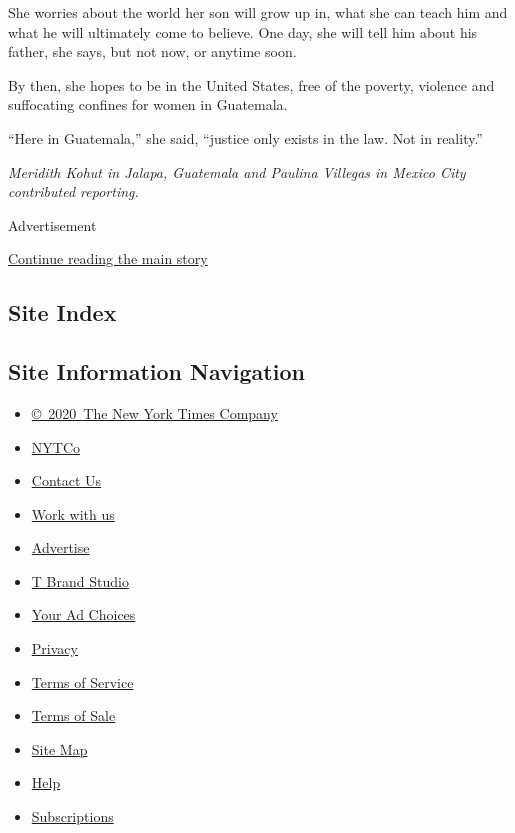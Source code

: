 She worries about the world her son will grow up in, what she can teach
him and what he will ultimately come to believe. One day, she will tell
him about his father, she says, but not now, or anytime soon.

By then, she hopes to be in the United States, free of the poverty,
violence and suffocating confines for women in Guatemala.

``Here in Guatemala,'' she said, ``justice only exists in the law. Not
in reality.''

\emph{Meridith Kohut in Jalapa, Guatemala and Paulina Villegas in Mexico
City contributed reporting.}

Advertisement

\protect\hyperlink{after-bottom}{Continue reading the main story}

\hypertarget{site-index}{%
\subsection{Site Index}\label{site-index}}

\hypertarget{site-information-navigation}{%
\subsection{Site Information
Navigation}\label{site-information-navigation}}

\begin{itemize}
\tightlist
\item
  \href{https://help.nytimes3xbfgragh.onion/hc/en-us/articles/115014792127-Copyright-notice}{©~2020~The
  New York Times Company}
\end{itemize}

\begin{itemize}
\tightlist
\item
  \href{https://www.nytco.com/}{NYTCo}
\item
  \href{https://help.nytimes3xbfgragh.onion/hc/en-us/articles/115015385887-Contact-Us}{Contact
  Us}
\item
  \href{https://www.nytco.com/careers/}{Work with us}
\item
  \href{https://nytmediakit.com/}{Advertise}
\item
  \href{http://www.tbrandstudio.com/}{T Brand Studio}
\item
  \href{https://www.nytimes3xbfgragh.onion/privacy/cookie-policy\#how-do-i-manage-trackers}{Your
  Ad Choices}
\item
  \href{https://www.nytimes3xbfgragh.onion/privacy}{Privacy}
\item
  \href{https://help.nytimes3xbfgragh.onion/hc/en-us/articles/115014893428-Terms-of-service}{Terms
  of Service}
\item
  \href{https://help.nytimes3xbfgragh.onion/hc/en-us/articles/115014893968-Terms-of-sale}{Terms
  of Sale}
\item
  \href{https://spiderbites.nytimes3xbfgragh.onion}{Site Map}
\item
  \href{https://help.nytimes3xbfgragh.onion/hc/en-us}{Help}
\item
  \href{https://www.nytimes3xbfgragh.onion/subscription?campaignId=37WXW}{Subscriptions}
\end{itemize}
